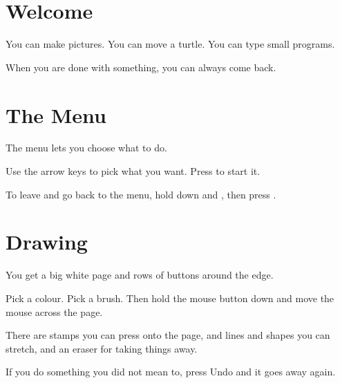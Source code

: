 \documentclass[12pt,oneside,paper=5.5in:8.5in,DIV=11,chapterprefix=false,headings=big]{scrbook}
\begin{document}

\renewcommand*{\contentsname}{What Is Inside}
\chaptericon{\faListUl}
\kidcompactheadtrue
\tableofcontents
\kidcompactheadfalse

\mainmatter

\chaptericon{\faDesktop}
\chapter{Welcome}


You can make pictures.
You can move a turtle.
You can type small programs.

When you are done with something,
you can always come back.

\chaptericon{\faBars}
\chapter{The Menu}


The menu lets you choose what to do.

Use the arrow keys to pick what you want.
Press  to start it.

To leave and go back to the menu, hold down
 and , then press .

\chaptericon{\faPaintBrush}
\chapter{Drawing}


You get a big white page
and rows of buttons around the edge.

Pick a colour.
Pick a brush.
Then hold the mouse button down
and move the mouse across the page.

There are stamps you can press onto the page,
and lines and shapes you can stretch,
and an eraser for taking things away.

If you do something you did not mean to,
press Undo and it goes away again.
\end{document}
